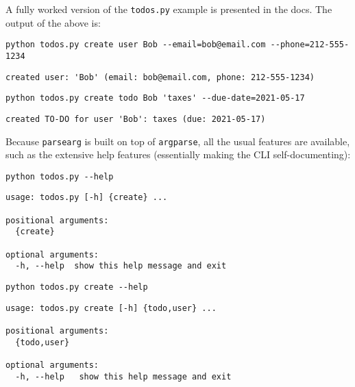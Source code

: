\documentclass[10pt]{amsart}
\numberwithin{equation}{section}
\begin{document}
A fully worked version of the \texttt{todos.py} example is presented in the docs. The output
of the above is:
\begin{verbatim}
python todos.py create user Bob --email=bob@email.com --phone=212-555-1234
\end{verbatim}

\begin{verbatim}
created user: 'Bob' (email: bob@email.com, phone: 212-555-1234)
\end{verbatim}


\begin{verbatim}
python todos.py create todo Bob 'taxes' --due-date=2021-05-17
\end{verbatim}

\begin{verbatim}
created TO-DO for user 'Bob': taxes (due: 2021-05-17)
\end{verbatim}


Because \texttt{parsearg} is built on top of \texttt{argparse}, all the usual features
are available, such as the extensive help features (essentially
making the CLI self-documenting):
\begin{verbatim}
python todos.py --help
\end{verbatim}

\begin{verbatim}
usage: todos.py [-h] {create} ...

positional arguments:
  {create}

optional arguments:
  -h, --help  show this help message and exit
\end{verbatim}



\begin{verbatim}
python todos.py create --help
\end{verbatim}

\begin{verbatim}
usage: todos.py create [-h] {todo,user} ...

positional arguments:
  {todo,user}

optional arguments:
  -h, --help   show this help message and exit
\end{verbatim}
\end{document}
